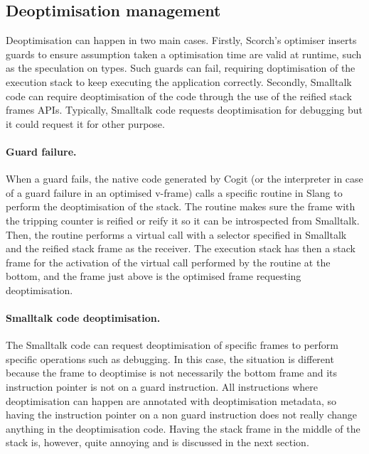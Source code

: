 \documentclass[a4paper,12pt,twoside]{../includes/ThesisStyle}
\begin{document}
\subsection{Deoptimisation management}

Deoptimisation can happen in two main cases. Firstly, Scorch's optimiser inserts guards to ensure assumption taken a optimisation time are valid at runtime, such as the speculation on types. Such guards can fail, requiring doptimisation of the execution stack to keep executing the application correctly. Secondly, Smalltalk code can require deoptimisation of the code through the use of the reified stack frames APIs. Typically, Smalltalk code requests deoptimisation for debugging but it could request it for other purpose.

\paragraph{Guard failure.} When a guard fails, the native code generated by Cogit (or the interpreter in case of a guard failure in an optimised v-frame) calls a specific routine in Slang to perform the deoptimisation of the stack. The routine makes sure the frame with the tripping counter is reified or reify it so it can be introspected from Smalltalk. Then, the routine performs a virtual call with a selector specified in Smalltalk and the reified stack frame as the receiver. The execution stack has then a stack frame for the activation of the virtual call performed by the routine at the bottom, and the frame just above is the optimised frame requesting deoptimisation. 


\paragraph{Smalltalk code deoptimisation.}The Smalltalk code can request deoptimisation of specific frames to perform specific operations such as debugging. In this case, the situation is different because the frame to deoptimise is not necessarily the bottom frame and its instruction pointer is not on a guard instruction. All instructions where deoptimisation can happen are annotated with deoptimisation metadata, so having the instruction pointer on a non guard instruction does not really change anything in the deoptimisation code. Having the stack frame in the middle of the stack is, however, quite annoying and is discussed in the next section.
\end{document}
